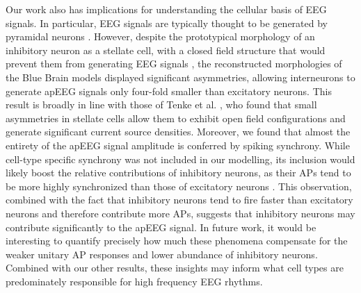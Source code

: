 Our work also has implications for understanding the cellular basis of EEG signals. In particular, EEG signals are typically thought to be generated by pyramidal neurons \cite{Eccles1951, Nunez2006}. However, despite the prototypical morphology of an inhibitory neuron as a stellate cell, with a closed field structure that would prevent them from generating EEG signals \cite{Baker2003}, the reconstructed morphologies of the Blue Brain models \cite{Markram2015} displayed significant asymmetries, allowing interneurons to generate apEEG signals only four-fold smaller than excitatory neurons. This result is broadly in line with those of Tenke et al. \cite{Tenke1993}, who found that small asymmetries in stellate cells allow them to exhibit open field configurations and generate significant current source densities. Moreover, we found that almost the entirety of the apEEG signal amplitude is conferred by spiking synchrony. While cell-type specific synchrony was not included in our modelling, its inclusion would likely boost the relative contributions of inhibitory neurons, as their APs tend to be more highly synchronized than those of excitatory neurons  \cite{Gentet2010}. This observation, combined with the fact that inhibitory neurons tend to fire faster than excitatory neurons and therefore contribute more APs, suggests that inhibitory neurons may contribute significantly to the apEEG signal. In future work, it would be interesting to quantify precisely how much these phenomena compensate for the weaker unitary AP responses and lower abundance of inhibitory neurons. Combined with our other results, these insights may inform what cell types are predominately responsible for high frequency EEG rhythms.

